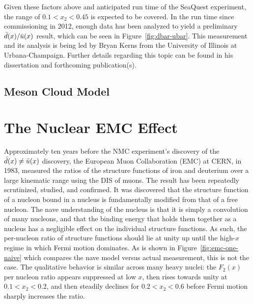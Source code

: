 Given these factors above and anticipated run time of the SeaQuest experiment, the range of $0.1<x_2<0.45$ is expected to be covered. In the run time since commissioning in 2012, enough data has been analyzed to yield a preliminary $\bar{d}(x)/\bar{u}(x)$ result, which can be seen in Figure~\ref{fig:dbar-ubar}. This measurement and its analysis is being led by Bryan Kerns from the University of Illinois at Urbana-Champaign. Further details regarding this topic can be found in his dissertation and forthcoming publication(s).

\subsection{Meson Cloud Model}


\section{The Nuclear EMC Effect}

Approximately ten years before the NMC experiment's discovery of the $\bar{d}(x)\neq\bar{u}(x)$ discovery, the European Muon Collaboration (EMC) at CERN, in 1983, measured the ratios of the structure functions of iron and deuterium over a large kinematic range using the DIS of muons\cite{Aubert:1983xm}. The result has been repeatedly scrutinized, studied, and confirmed. It was discovered that the structure function of a nucleon bound in a nucleus is fundamentally modified from that of a free nucleon. The nave understanding of the nucleus is that it is simply a convolution of many nucleons, and that the binding energy that holds them together as a nucleus has a negligible effect on the individual structure functions. As such, the per-nucleon ratio of structure functions should lie at unity up until the high-$x$ regime in which Fermi motion dominates. As is shown in Figure~\ref{fig:emc-one-naive} which compares the nave model versus actual measurement, this is not the case. The qualitative behavior is similar across many heavy nuclei: the $F_2(x)$ per nucleon ratio appears suppressed at low $x$, then rises towards unity at $0.1<x_2<0.2$, and then steadily declines for $0.2<x_2<0.6$ before Fermi motion sharply increases the ratio. 

